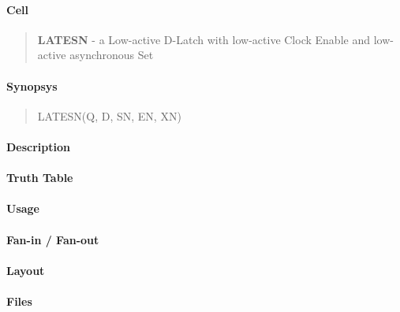 \label{LATESN}
\paragraph{Cell}
\begin{quote}
    \textbf{LATESN} - a Low-active D-Latch with low-active Clock Enable and low-active asynchronous Set
\end{quote}

\paragraph{Synopsys}
\begin{quote}
    LATESN(Q, D, SN, EN, XN)
\end{quote}

\paragraph{Description}

%

\paragraph{Truth Table}
%

\paragraph{Usage}

\paragraph{Fan-in / Fan-out}

\paragraph{Layout}

\paragraph{Files}
